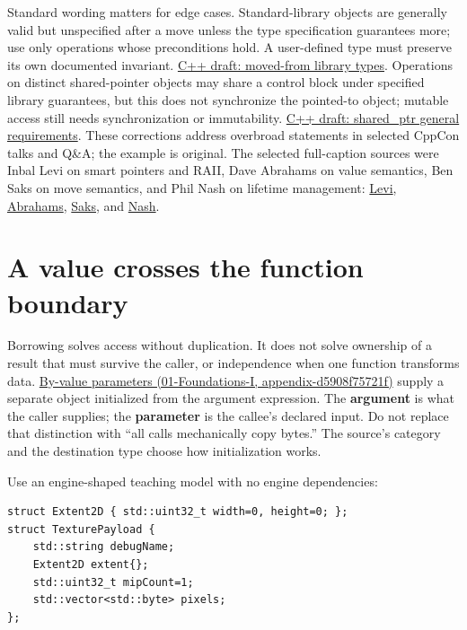 Standard wording matters for edge cases. Standard-library objects are generally valid but unspecified after a move unless the type specification guarantees more; use only operations whose preconditions hold. A user-defined type must preserve its own documented invariant. \href{https://eel.is/c++draft/lib.types.movedfrom}{C++ draft: moved-from library types}. Operations on distinct shared-pointer objects may share a control block under specified library guarantees, but this does not synchronize the pointed-to object; mutable access still needs synchronization or immutability. \href{https://eel.is/c++draft/util.smartptr.shared}{C++ draft: shared\_ptr general requirements}. These corrections address overbroad statements in selected CppCon talks and Q\&A; the example is original. The selected full-caption sources were Inbal Levi on smart pointers and RAII, Dave Abrahams on value semantics, Ben Saks on move semantics, and Phil Nash on lifetime management: \href{https://www.youtube.com/watch?v=07rJOzFRs6M}{Levi}, \href{https://www.youtube.com/watch?v=QthAU-t3PQ4}{Abrahams}, \href{https://www.youtube.com/watch?v=szU5b972F7E}{Saks}, and \href{https://www.youtube.com/watch?v=aMvIv6blzBs}{Nash}.

\section{A value crosses the function boundary}\label{05-engine-i-ch003-a-value-crosses-the-function-boundary}

Borrowing solves access without duplication. It does not solve ownership of a result that must survive the caller, or independence when one function transforms data. \href{../01-Foundations-I/main.pdf\#nameddest=appendix-d5908f75721f}{By-value parameters (01-Foundations-I, appendix-d5908f75721f)} supply a separate object initialized from the argument expression. The \textbf{argument} is what the caller supplies; the \textbf{parameter} is the callee's declared input. Do not replace that distinction with ``all calls mechanically copy bytes.'' The source's category and the destination type choose how initialization works.

Use an engine-shaped teaching model with no engine dependencies:

\begin{verbatim}
struct Extent2D { std::uint32_t width=0, height=0; };
struct TexturePayload {
    std::string debugName;
    Extent2D extent{};
    std::uint32_t mipCount=1;
    std::vector<std::byte> pixels;
};
\end{verbatim}

